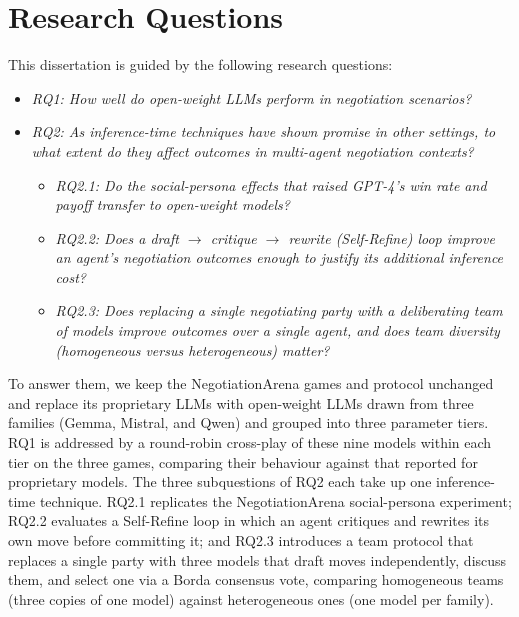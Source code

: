 \section{Research Questions}
This dissertation is guided by the following research questions:

\begin{itemize}
    \item \textit{RQ1: How well do open-weight LLMs perform in negotiation scenarios?}
    \item \textit{RQ2: As inference-time techniques have shown promise in other settings, to what extent do they affect outcomes in multi-agent negotiation contexts?}
    \begin{itemize}
        \item \textit{RQ2.1: Do the social-persona effects that raised GPT-4's win rate and payoff transfer to open-weight models?}
        \item \textit{RQ2.2: Does a draft $\rightarrow$ critique $\rightarrow$ rewrite (Self-Refine) loop improve an agent's negotiation outcomes enough to justify its additional inference cost?}
        \item \textit{RQ2.3: Does replacing a single negotiating party with a deliberating team of models improve outcomes over a single agent, and does team diversity (homogeneous versus heterogeneous) matter?}
    \end{itemize}
\end{itemize}

To answer them, we keep the NegotiationArena games and protocol unchanged and replace its proprietary \ac{LLM}s with open-weight \ac{LLM}s drawn from three families (Gemma, Mistral, and Qwen) and grouped into three parameter tiers. RQ1 is addressed by a round-robin cross-play of these nine models within each tier on the three games, comparing their behaviour against that reported for proprietary models. The three subquestions of RQ2 each take up one inference-time technique. RQ2.1 replicates the NegotiationArena social-persona experiment; RQ2.2 evaluates a Self-Refine loop in which an agent critiques and rewrites its own move before committing it; and RQ2.3 introduces a team protocol that replaces a single party with three models that draft moves independently, discuss them, and select one via a Borda consensus vote, comparing homogeneous teams (three copies of one model) against heterogeneous ones (one model per family).

